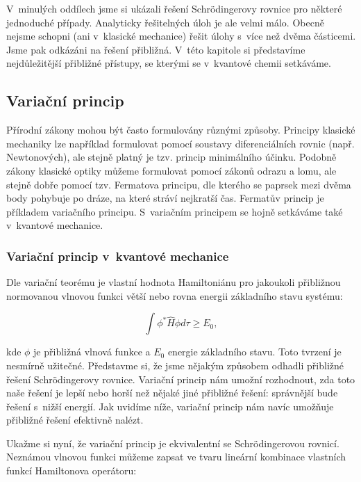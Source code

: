 V~minulých oddílech jsme si ukázali řešení Schr\"{o}dingerovy rovnice pro některé jednoduché případy. Analyticky řešitelných úloh je ale velmi málo. Obecně nejsme schopni (ani v~klasické mechanice) řešit úlohy s~více než dvěma částicemi. Jsme pak odkázáni na řešení přibližná. V~této kapitole si představíme nejdůležitější přibližné přístupy, se kterými se v~kvantové chemii setkáváme.

\subsection{Variační princip}

Přírodní zákony mohou být často formulovány různými způsoby. Principy klasické mechaniky lze například formulovat pomocí soustavy diferenciálních rovnic (např. Newtonových), ale stejně platný je tzv. princip minimálního účinku. Podobně zákony klasické optiky můžeme formulovat pomocí zákonů odrazu a lomu, ale stejně dobře pomocí tzv. Fermatova principu, dle kterého se paprsek mezi dvěma body pohybuje po dráze, na které stráví nejkratší čas. Fermatův princip je příkladem variačního principu. S~variačním principem se hojně setkáváme také v~kvantové mechanice. 

\subsubsection{Variační princip v~kvantové mechanice}

Dle variační teorému je vlastní hodnota Hamiltoniánu pro jakoukoli přibližnou normovanou vlnovou funkci větší nebo rovna energii základního stavu systému:

\begin{equation}
\int\phi^*\hat{H}\phi d\tau\geq E_0,
\label{rov:aprox-variacniteorem}
\end{equation}

\noindent kde $ \phi $ je přibližná vlnová funkce a $ E_0 $ energie základního stavu. Toto tvrzení je nesmírně užitečné. Představme si, že jsme nějakým způsobem odhadli přibližné řešení Schr\"{o}dingerovy rovnice. Variační princip nám umožní rozhodnout, zda toto naše řešení je lepší nebo horší než nějaké jiné přibližné řešení: správnější bude řešení s~nižší energií. Jak uvidíme níže, variační princip nám navíc umožňuje přibližné řešení efektivně nalézt. 


 Ukažme si nyní, že variační princip je ekvivalentní se Schr\"{o}dingerovou rovnicí. Neznámou vlnovou funkci můžeme zapsat ve tvaru lineární kombinace vlastních funkcí Hamiltonova operátoru:

